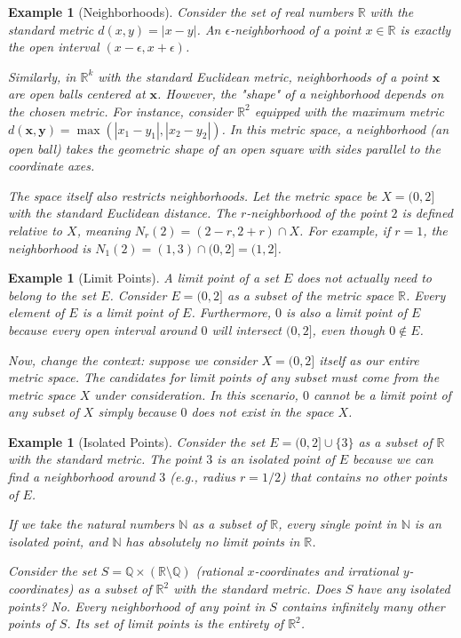 \documentclass{article}
\theoremstyle{mythm}
\newtheorem{example}[theorem]{Example}
\begin{document}
\begin{example}[Neighborhoods]
Consider the set of real numbers $\mathbb{R}$ with the standard metric $d(x,y) = |x - y|$. An $\epsilon$-neighborhood of a point $x \in \mathbb{R}$ is exactly the open interval $(x - \epsilon, x + \epsilon)$. 

Similarly, in $\mathbb{R}^k$ with the standard Euclidean metric, neighborhoods of a point $\mathbf{x}$ are open balls centered at $\mathbf{x}$. 
However, the "shape" of a neighborhood depends on the chosen metric. For instance, consider $\mathbb{R}^2$ equipped with the maximum metric $d(\mathbf{x}, \mathbf{y}) = \max(|x_1 - y_1|, |x_2 - y_2|)$. In this metric space, a neighborhood (an open ball) takes the geometric shape of an open square with sides parallel to the coordinate axes.

The space itself also restricts neighborhoods. Let the metric space be $X = (0, 2]$ with the standard Euclidean distance. The $r$-neighborhood of the point $2$ is defined relative to $X$, meaning $N_r(2) = (2 - r, 2 + r) \cap X$. For example, if $r = 1$, the neighborhood is $N_1(2) = (1, 3) \cap (0, 2] = (1, 2]$. 
\end{example}

\begin{example}[Limit Points]
A limit point of a set $E$ does not actually need to belong to the set $E$. Consider $E = (0, 2]$ as a subset of the metric space $\mathbb{R}$. Every element of $E$ is a limit point of $E$. Furthermore, $0$ is also a limit point of $E$ because every open interval around $0$ will intersect $(0, 2]$, even though $0 \notin E$.

Now, change the context: suppose we consider $X = (0, 2]$ itself as our entire metric space. The candidates for limit points of any subset must come from the metric space $X$ under consideration. In this scenario, $0$ cannot be a limit point of any subset of $X$ simply because $0$ does not exist in the space $X$.
\end{example}

\begin{example}[Isolated Points]
Consider the set $E = (0, 2] \cup \{3\}$ as a subset of $\mathbb{R}$ with the standard metric. The point $3$ is an isolated point of $E$ because we can find a neighborhood around $3$ (e.g., radius $r=1/2$) that contains no other points of $E$. 

If we take the natural numbers $\mathbb{N}$ as a subset of $\mathbb{R}$, every single point in $\mathbb{N}$ is an isolated point, and $\mathbb{N}$ has absolutely no limit points in $\mathbb{R}$.

Consider the set $S = \mathbb{Q} \times (\mathbb{R} \setminus \mathbb{Q})$ (rational $x$-coordinates and irrational $y$-coordinates) as a subset of $\mathbb{R}^2$ with the standard metric. Does $S$ have any isolated points? No. Every neighborhood of any point in $S$ contains infinitely many other points of $S$. Its set of limit points is the entirety of $\mathbb{R}^2$.
\end{example}
\end{document}
